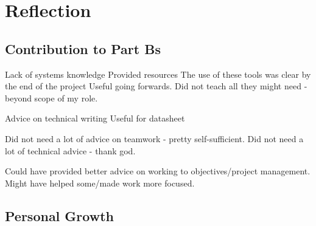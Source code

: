 

\section{Reflection}\label{sec:reflection}
    \subsection{Contribution to Part Bs}\label{subsec:reflection-partBs}
        Lack of systems knowledge
        Provided resources
        The use of these tools was clear by the end of the project
        Useful going forwards.
        Did not teach all they might need - beyond scope of my role.

        Advice on technical writing
        Useful for datasheet

        Did not need a lot of advice on teamwork - pretty self-sufficient.
        Did not need a lot of technical advice - thank god.

        Could have provided better advice on working to objectives/project management.
        Might have helped some/made work more focused.

    \subsection{Personal Growth}\label{subsec:reflection-personal}
